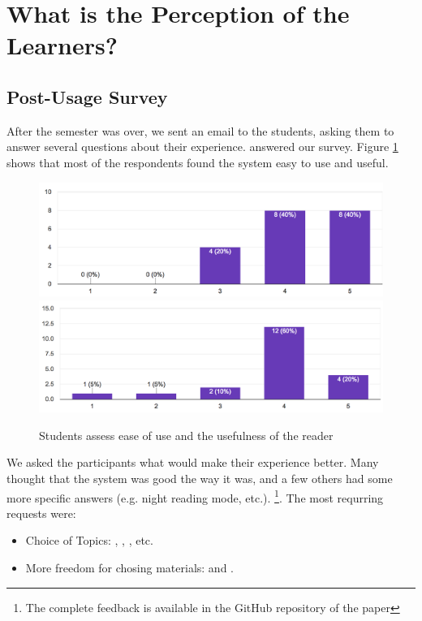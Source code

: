 
\newpage
\section{What is the Perception of the Learners?}

\subsection{Post-Usage Survey}

After the semester was over, we sent an email to the students, asking them to answer several questions about their experience. \surveyrespondents answered our survey. Figure \ref{fig:reader_use} shows that most of the respondents found the system easy to use and useful. 

 \begin{figure}[h!]
    \centering
      \includegraphics[width=0.8\columnwidth]{figures/opinions/reader_ease_of_use}
      \includegraphics[width=0.8\columnwidth]{figures/opinions/reader_usefulness}
      \caption{Students assess ease of use and the usefulness of the reader}
      \label{fig:reader_use}
    \end{figure}

We asked the participants what would make their experience better. Many thought that the system was good the way it was, and a few others had some more specific answers (e.g. night reading mode, etc.). \footnote{The complete feedback is available in the GitHub repository of the paper}. The most requrring requests were: 

\begin{itemize}
	\item Choice of Topics: 
		, 
		, 
		, etc.
	\item More freedom for chosing materials: 
		 and 
		. 
\end{itemize}

